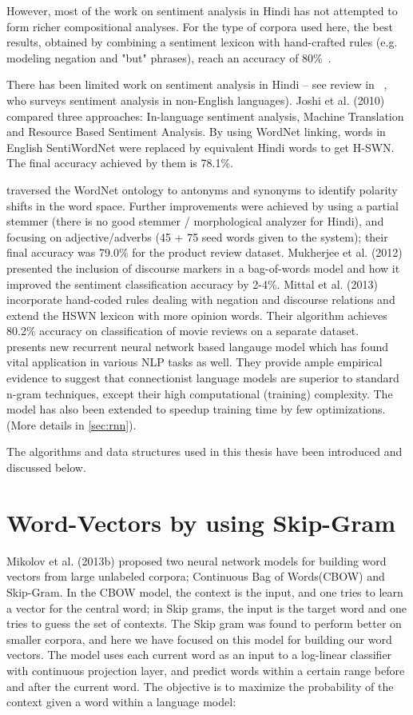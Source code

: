 However, most of the work on sentiment analysis in Hindi has not attempted to form richer compositional analyses.   For the type of corpora used here, the best results, obtained by combining a sentiment lexicon with hand-crafted rules (e.g. modeling negation and "but" phrases), reach an accuracy of 80\%~\cite{Mittal:13}.

There has been limited work on sentiment analysis in Hindi -- see review in
~\cite{Medagoda:13}, who surveys sentiment analysis in non-English languages). Joshi et al. (2010) compared three approaches: In-language sentiment
analysis, Machine Translation and Resource Based Sentiment Analysis. By using WordNet linking, words in English SentiWordNet were replaced by equivalent Hindi words to get H-SWN. The final accuracy achieved by them is 78.1\%.

\cite{Bakliwal:12}
traversed the WordNet ontology to antonyms and synonyms 
to identify polarity shifts in the word space. Further
improvements were achieved by using a partial stemmer (there is no good
stemmer / morphological analyzer for Hindi), and focusing on 
adjective/adverbs (45 + 75 seed words given to the system); their 
final accuracy was 79.0\% for the product review dataset. 
Mukherjee et al. (2012) presented the inclusion of discourse markers in a bag-of-words model and how it improved the sentiment classification accuracy by 2-4\%.  %
Mittal et al. (2013) incorporate hand-coded rules dealing with negation and discourse relations and extend the HSWN lexicon with more opinion words.  Their algorithm achieves  80.2\%
accuracy on classification of movie reviews on a separate dataset.\\

\cite{Mikolov:10} presents new recurrent neural network based langauge model which has found vital application in various NLP tasks as well. They provide ample empirical evidence to suggest that connectionist language models are superior to standard n-gram techniques, except their high computational (training) complexity. The model has also been extended to speedup training time by few optimizations.(More details in \ref{sec:rnn}).

The algorithms and data structures used in this thesis have been introduced and discussed below.
\section{Word-Vectors by using Skip-Gram}
\label{sec:skipgram}
Mikolov et al. (2013b) proposed two neural network models for building word vectors from large unlabeled corpora; Continuous Bag of Words(CBOW) and Skip-Gram.  In the CBOW model, the context is the input, and one tries to learn a vector for the central word; in Skip grams, the input is the target word and one tries to guess the set of contexts.  The Skip gram was found to perform better on smaller corpora, and here we have focused on this model for building our word vectors. The model uses each current word as an input to a log-linear classifier with continuous projection layer, and predict words within a certain range before and after the current word. The objective is to maximize the probability of the context given a word within a language model:

